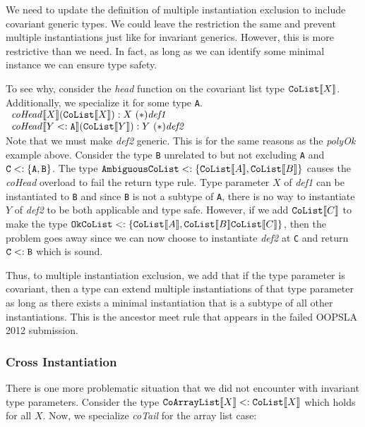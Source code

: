 \documentclass[preprint]{sigplanconf}
\newcommand{\ob}[1]{\ensuremath{\llbracket {#1} \rrbracket}}
\begin{document}
We need to update the definition of multiple instantiation exclusion to include covariant generic types.
We could leave the restriction the same and prevent multiple instantiations just like for invariant generics.
However, this is more restrictive than we need.  In fact, as long as we can identify some minimal instance
we can ensure type safety. 

To see why, consider the {\it head} function on the covariant list type ${\tt CoList}\ob{X}$.  Additionally,
we specialize it for some type {\tt A}.\\

$\begin{array}{l}
{\it coHead}\ob{X}({\tt CoList}\ob{X}) :X~(*){\it def1}\\
{\it coHead}\ob{Y <: {\tt A}}({\tt CoList}\ob{Y}) : Y~(*){\it def2}\\
\end{array}$\\

Note that we must make {\it def2} generic.  This is for the same reasons as the {\it polyOk} example above.
Consider the type {\tt B} unrelated to but not excluding {\tt A} and ${\tt C} <: \{ {\tt A}, {\tt B}\}$.  The type
${\tt AmbiguousCoList} <: \{ {\tt CoList}\ob{A}, {\tt CoList}\ob{B} \}$ causes the {\it coHead} overload to fail the 
return type rule.  Type parameter $X$ of {\it def1} can be instantiated to {\tt B} and since {\tt B} is not a subtype
of {\tt A}, there is no way to instantiate $Y$ of {\it def2} to be both applicable and type safe.  However, if we add
${\tt CoList}\ob{C}$ to make the type ${\tt OkCoList} <: \{ {\tt CoList}\ob{A}, {\tt CoList}\ob{B} {\tt CoList}\ob{C} \}$,
then the problem goes away since we can now choose to instantiate {\it def2} at {\tt C} and return ${\tt C} <: {\tt B}$
which is sound.

Thus, to multiple instantiation exclusion, we add that if the type parameter is covariant, then a type can extend multiple
instantiations of that type parameter as long as there exists a minimal instantiation that is a subtype of all other instantiations.
This is the ancestor meet rule that appears in the failed OOPSLA 2012 submission.

\subsubsection{Cross Instantiation}

There is one more problematic situation that we did not encounter with invariant type parameters.  Consider the
type ${\tt CoArrayList}\ob{X} <: {\tt CoList}\ob{X}$ which holds for all $X$.  Now, we specialize {\it coTail} for
the array list case:\\
\end{document}
